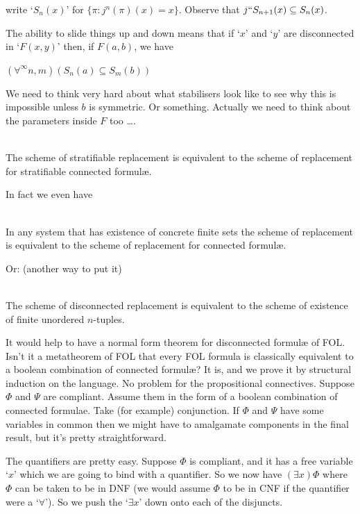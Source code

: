\documentclass[12pt]{article}
\begin{document}
{write `$S_n(x)$' for $\{\pi: j^n(\pi)(x) = x\}$.   Observe that
$j``S_{n+1}(x) \subseteq S_n(x)$.

The ability to slide things up and down means that if `$x$' and `$y$' are
disconnected in `$F(x,y)$' then, if $F(a,b)$, we have

$(\forall^\infty n, m)(S_n(a) \subseteq S_m(b))$

We need to think very hard about what stabilisers look like to see why
this is impossible unless $b$ is symmetric. Or something.  Actually we
need to think about the parameters inside $F$ too \ldots.

\begin{lem}\mbox{\negthinspace}\\
  The scheme of stratifiable replacement is equivalent to the scheme
  of replacement for stratifiable connected formul{\ae}.\end{lem}

In fact we even have

\begin{lem}\mbox{\negthinspace}\\
In any system that has existence of concrete finite sets the scheme of
replacement is equivalent to the scheme of replacement for connected
formul{\ae}.\end{lem}
Or: (another way to put it)
\begin{lem}\mbox{\negthinspace}\\
  The scheme of disconnected replacement is equivalent to the scheme of
  existence of finite unordered $n$-tuples.\end{lem}

It would help to have a normal form theorem for disconnected formul{\ae}
of FOL.  Isn't it a metatheorem of FOL that every FOL formula is
classically equivalent to a boolean combination of connected formul{\ae}?
It is, and we prove it by structural induction on the language.  No
problem for the propositional connectives.  Suppose $\Phi$ and $\Psi$
are compliant.  Assume them in the form of a boolean combination of
connected formulae.  Take (for example) conjunction. If $\Phi$ and $\Psi$
have some variables in common then we might have to amalgamate components
in the final result, but it's pretty straightforward.

The quantifiers are pretty easy.  Suppose $\Phi$ is compliant, and it
has a free variable `$x$' which we are going to bind with a quantifier.
So we now have $(\exists x)\Phi$ where $\Phi$ can be taken to be in DNF
(we would assume $\Phi$ to be in CNF if the quantifier were a `$\forall$').
So we push the `$\exists x$' down onto each of the disjuncts.

}
\end{document}
